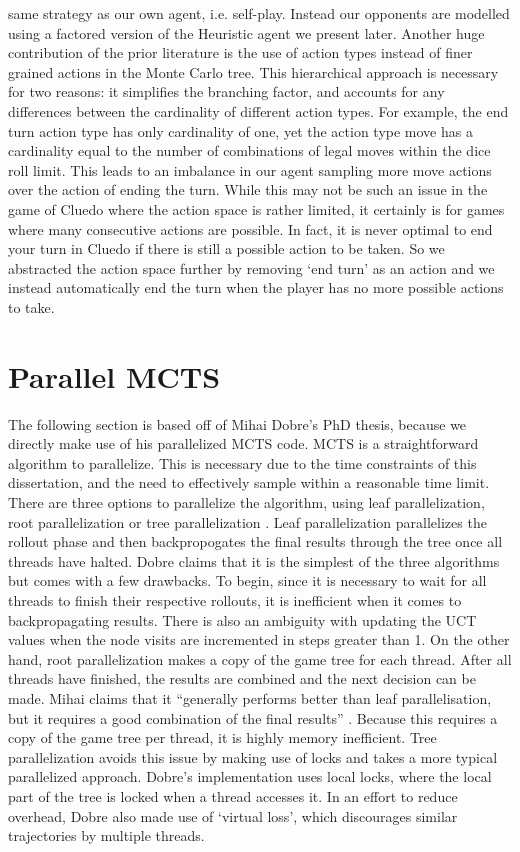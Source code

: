 \documentclass[msc, deptreport, ai, romanprepages]{infthesis}
\begin{document}
same strategy as our own agent, i.e. self-play. Instead our opponents are modelled using a factored version of the Heuristic agent we present later.
Another huge contribution of the prior literature is the use of action types instead of finer grained actions in the Monte Carlo tree. This hierarchical approach is necessary for two reasons: it simplifies the branching factor, and accounts for any differences between the cardinality of different action types. For example, the end turn action type has only cardinality of one, yet the action type move has a cardinality equal to the number of combinations of legal moves within the dice roll limit. This leads to an imbalance in our agent sampling more move actions over the action of ending the turn. While this may not be such an issue in the game of Cluedo where the action space is rather limited, it certainly is for games where many consecutive actions are possible. In fact, it is never optimal to end your turn in Cluedo if there is still a possible action to be taken. So we abstracted the action space further by removing ‘end turn’ as an action and we instead automatically end the turn when the player has no more possible actions to take.

\section{Parallel MCTS}
The following section is based off of Mihai Dobre’s PhD thesis, because we directly make use of his parallelized MCTS code. MCTS is a straightforward algorithm to parallelize. This is necessary due to the time constraints of this dissertation, and the need to effectively sample within a reasonable time limit. There are three options to parallelize the algorithm, using leaf parallelization, root parallelization or tree parallelization \cite{Mihai}. Leaf parallelization parallelizes the rollout phase and then backpropogates the final results through the tree once all threads have halted. Dobre claims that it is the simplest of the three algorithms but comes with a few drawbacks. To begin, since it is necessary to wait for all threads to finish their respective rollouts, it is inefficient when it comes to backpropagating results. There is also an ambiguity with updating the UCT values when the node visits are incremented in steps greater than 1. On the other hand, root parallelization makes a copy of the game tree for each thread. After all threads have finished, the results are combined and the next decision can be made. Mihai claims that it “generally performs better than leaf parallelisation, but it requires a good combination of the final results” \cite{Mihai}. Because this requires a copy of the game tree per thread, it is highly memory inefficient. Tree parallelization avoids this issue by making use of locks and takes a more typical parallelized approach. Dobre’s implementation uses local locks, where the local part of the tree is locked when a thread accesses it. In an effort to reduce overhead, Dobre also made use of ‘virtual loss’, which discourages similar trajectories by multiple threads.
\end{document}
